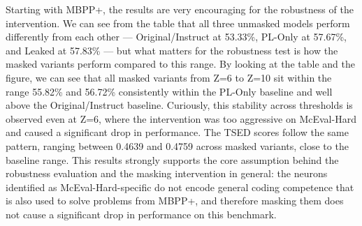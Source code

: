 \documentclass[mscthesis]{usiinfthesis}
\begin{document}
\begin{table}[h]
\centering
\caption{Accuracy and TSED on MBPP+ for baseline models and masked variants.}
\label{tab:mbpp_robustness}
\end{table}

Starting with MBPP+, the results are very encouraging for the robustness of the intervention.
We can see from the table that all three unmasked models perform differently from each other --- Original/Instruct at 53.33\%, PL-Only at 57.67\%, and
Leaked at 57.83\% --- but what matters for the robustness test is how the masked variants
perform compared to this range. 
By looking at the table and the figure, we can see that all masked variants from Z=6 to Z=10 sit within the range 55.82\% and 56.72\%
consistently within the PL-Only baseline and well above the Original/Instruct baseline.
Curiously, this stability across thresholds is observed even at Z=6, where the intervention was too aggressive on McEval-Hard and caused a significant drop in performance.
The TSED scores follow the same pattern, ranging between 0.4639 and
0.4759 across masked variants, close to the baseline range. 
This results strongly supports the core assumption behind the robustness evaluation and the masking intervention in general: the neurons identified as McEval-Hard-specific do not encode general coding competence that is also used to solve problems from MBPP+, and therefore masking them does not cause a significant drop in performance on this benchmark.

\end{document}
